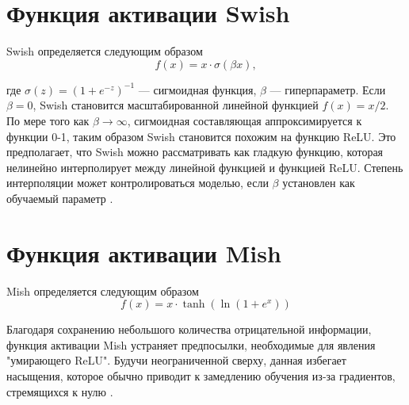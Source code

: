 	
	
\section {Функция активации Swish}
	Swish определяется следующим образом
	\begin{equation}
		f(x) = x \cdot \sigma(\beta x),
	\end{equation}
	
	где $\sigma(z) = (1 + e^{-z})^{-1}$ — сигмоидная функция, $\beta$ — гиперпараметр.\newline
	Если $\beta = 0$, Swish становится масштабированной линейной функцией $f(x) = x/2$. По мере того как $\beta \to \infty$, сигмоидная составляющая аппроксимируется к функции 0-1, таким образом Swish становится похожим на функцию ReLU. Это предполагает, что Swish можно рассматривать как гладкую функцию, которая нелинейно интерполирует между линейной функцией и функцией ReLU. Степень интерполяции может контролироваться моделью, если $\beta$ установлен как обучаемый параметр \cite{survey, berkeley}.
	
	
	
	
\section {Функция активации Mish}
	Mish определяется следующим образом
	\begin{equation}
		f(x) = x \cdot \tanh(\ln(1 + e^x))
	\end{equation}
	
	Благодаря сохранению небольшого количества отрицательной информации, функция активации Mish устраняет предпосылки, необходимые для явления "умирающего ReLU". Будучи неограниченной сверху, данная избегает насыщения, которое обычно приводит к замедлению обучения из-за градиентов, стремящихся к нулю \cite{survey, sparsecnn}.
	
	
